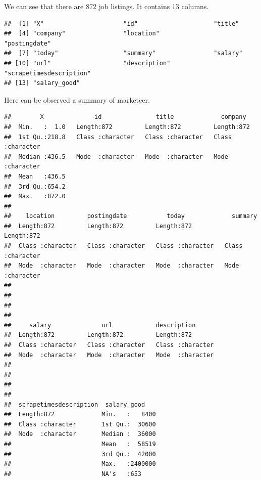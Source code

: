 \documentclass[
]{article}
\begin{document}
We can see that there are 872 job listings. It contains 13 columns.

\begin{verbatim}
##  [1] "X"                      "id"                     "title"                 
##  [4] "company"                "location"               "postingdate"           
##  [7] "today"                  "summary"                "salary"                
## [10] "url"                    "description"            "scrapetimesdescription"
## [13] "salary_good"
\end{verbatim}

Here can be observed a summary of marketeer.

\begin{verbatim}
##        X              id               title             company         
##  Min.   :  1.0   Length:872         Length:872         Length:872        
##  1st Qu.:218.8   Class :character   Class :character   Class :character  
##  Median :436.5   Mode  :character   Mode  :character   Mode  :character  
##  Mean   :436.5                                                           
##  3rd Qu.:654.2                                                           
##  Max.   :872.0                                                           
##                                                                          
##    location         postingdate           today             summary         
##  Length:872         Length:872         Length:872         Length:872        
##  Class :character   Class :character   Class :character   Class :character  
##  Mode  :character   Mode  :character   Mode  :character   Mode  :character  
##                                                                             
##                                                                             
##                                                                             
##                                                                             
##     salary              url            description       
##  Length:872         Length:872         Length:872        
##  Class :character   Class :character   Class :character  
##  Mode  :character   Mode  :character   Mode  :character  
##                                                          
##                                                          
##                                                          
##                                                          
##  scrapetimesdescription  salary_good     
##  Length:872             Min.   :   8400  
##  Class :character       1st Qu.:  30600  
##  Mode  :character       Median :  36000  
##                         Mean   :  58519  
##                         3rd Qu.:  42000  
##                         Max.   :2400000  
##                         NA's   :653
\end{verbatim}
\end{document}
